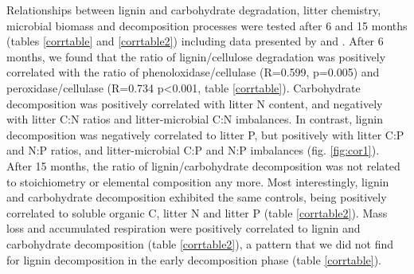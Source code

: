 Relationships between lignin and carbohydrate degradation, litter chemistry, microbial biomass and decomposition processes were tested after 6 and 15 months (tables \ref{corrtable} and \ref{corrtable2}) including data presented by \cite{Mooshammer2011} and \cite{Leitner2011}. After 6 months, we found that the ratio of lignin/cellulose degradation was positively correlated with the ratio of phenoloxidase/cellulase (R=0.599, p=0.005) and peroxidase/cellulase (R=0.734 p\textless 0.001, table \ref{corrtable}). Carbohydrate decomposition was positively correlated with litter N content, and negatively with litter C:N ratios and litter-microbial C:N imbalances. In contrast, lignin decomposition was negatively correlated to litter P, but positively with litter C:P and N:P ratios, and litter-microbial C:P and N:P imbalances (fig. \ref{fig:cor1}). After 15 months, the ratio of lignin/carbohydrate decomposition was not related to stoichiometry or elemental composition any more. Most interestingly, lignin and carbohydrate decomposition exhibited the same controls, being positively correlated to soluble organic C, litter N and litter P (table \ref{corrtable2}). Mass loss and accumulated respiration were positively correlated to lignin and carbohydrate decomposition (table \ref{corrtable2}), a pattern that we did not find for lignin decomposition in the early decomposition phase (table \ref{corrtable}).
